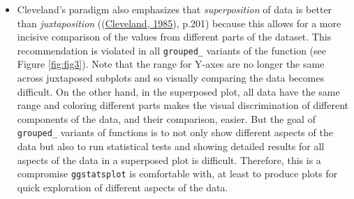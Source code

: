 \documentclass[
]{article}
\providecommand{\tightlist}{%
  \setlength{\itemsep}{0pt}\setlength{\parskip}{0pt}}
\begin{document}
\begin{itemize}
\tightlist
\item
  Cleveland's paradigm also emphasizes that \emph{superposition} of data is better
  than \emph{juxtaposition} ((\protect\hyperlink{ref-clevelandElementsGraphingData1985}{Cleveland, 1985}), p.201) because
  this allows for a more incisive comparison of the values from different
  parts of the dataset. This recommendation is violated in all \texttt{grouped\_}
  variants of the function (see Figure \ref{fig:fig3}). Note that the range
  for Y-axes are no longer the same across juxtaposed subplots and so visually
  comparing the data becomes difficult. On the other hand, in the superposed
  plot, all data have the same range and coloring different parts makes the
  visual discrimination of different components of the data, and their
  comparison, easier. But the goal of \texttt{grouped\_} variants of functions is to
  not only show different aspects of the data but also to run statistical
  tests and showing detailed results for all aspects of the data in a
  superposed plot is difficult. Therefore, this is a compromise \texttt{ggstatsplot}
  is comfortable with, at least to produce plots for quick exploration of
  different aspects of the data.
\end{itemize}
\end{document}
